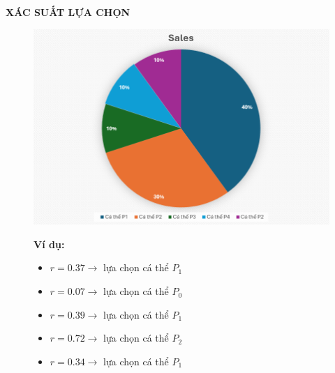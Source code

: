 \documentclass{book}
\begin{document}
\begin{center}
    \textbf{XÁC SUẤT LỰA CHỌN}
\end{center}

\begin{figure}[H]
    \centering
    \begin{minipage}[c]{0.45\textwidth} %
        \centering
        \includegraphics[width=\linewidth]{images/pie_chart.png} %
    \end{minipage}
    \begin{minipage}[c]{0.45\textwidth}
        \textbf{Ví dụ:}
        \begin{itemize}
            \item $r = 0.37 \rightarrow$ lựa chọn cá thể $P_1$
            \item $r = 0.07 \rightarrow$ lựa chọn cá thể $P_0$
            \item $r = 0.39 \rightarrow$ lựa chọn cá thể $P_1$
            \item $r = 0.72 \rightarrow$ lựa chọn cá thể $P_2$
            \item $r = 0.34 \rightarrow$ lựa chọn cá thể $P_1$
        \end{itemize}
    \end{minipage}
\end{figure}
\end{document}
